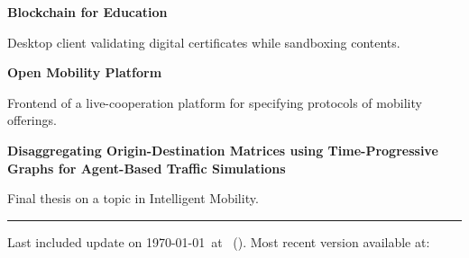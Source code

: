 \begin{paracol}{2}
\smallskip

 

\divider


\textbf{Blockchain for Education}

Desktop client validating digital certificates while sandboxing contents.

\smallskip


\medskip

\textbf{Open Mobility Platform}

Frontend of a live-cooperation platform for specifying protocols of mobility offerings.

\smallskip

 

\smallskip


\medskip



\textbf{Disaggregating Origin-Destination Matrices
using Time-Progressive Graphs for Agent-Based Traffic Simulations}

Final thesis on a topic in Intelligent Mobility.

\smallskip

   

\smallskip





\end{paracol}

\vfill
\hrule
\medskip
\small{
    Last included update on \today~at \DTMcurrenttime~(\DTMcurrentzone).
    Most recent version available at: 
}
